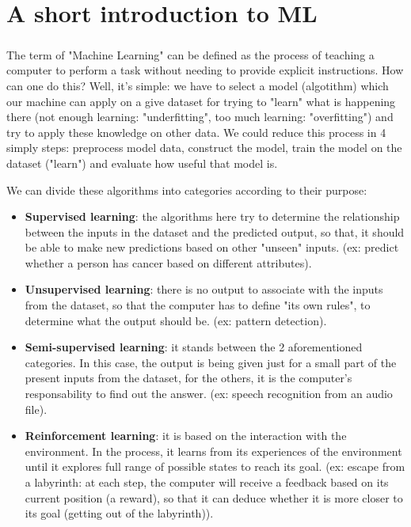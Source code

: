 \documentclass[a4paper,12pt]{report}
\begin{document}
{\let\clearpage\relax \chapter{A short introduction to ML}}
\paragraph{} 
The term of "Machine Learning" can be defined as the process of teaching a computer to perform a task without needing to provide explicit instructions. How can one do this? Well, it's simple: we have to select a model (algotithm) which our machine can apply on a give dataset for trying to "learn" what is happening there (not enough learning: "underfitting", too much learning: "overfitting") and try to apply these knowledge on other data. We could reduce this process in 4 simply steps: preprocess model data, construct the model, train the model on the dataset ("learn") and evaluate how useful that model is.

We can divide these algorithms into categories according to their purpose:
\begin{itemize}
    \item \textbf{Supervised learning}: the algorithms here try to determine the relationship between the inputs in the dataset and the predicted output, so that, it should be able to make new predictions based on other "unseen" inputs. (ex: predict whether a person has cancer based on different attributes).
    \item \textbf{Unsupervised learning}: there is no output to associate with the inputs from the dataset, so that the computer has to define "its own rules", to determine what the output should be. (ex: pattern detection).
    \item \textbf{Semi-supervised learning}: it stands between the 2 aforementioned categories. In this case, the output is being given just for a small part of the present inputs from the dataset, for the others, it is the computer's responsability to find out the answer. (ex: speech recognition from an audio file).
    \item \textbf{Reinforcement learning}: it is based on the interaction with the environment. In the process, it learns from its experiences of the environment until it explores full range of possible states to reach its goal. (ex: escape from a labyrinth: at each step, the computer will receive a feedback based on its current position (a reward), so that it can deduce whether it is more closer to its goal (getting out of the labyrinth)).
 \end{itemize}
\end{document}
